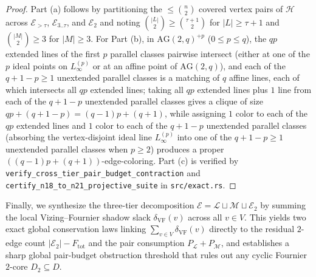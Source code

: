 \documentclass[11pt,reqno]{amsart}
\theoremstyle{definition}
\theoremstyle{remark}
\begin{document}
\begin{proof}
Part (a) follows by partitioning the $\le \binom{n}{2}$ covered vertex pairs of $\mathcal{H}$ across $\mathcal{E}_{>\tau}$, $\mathcal{E}_{3..\tau}$, and $\mathcal{E}_2$ and noting $\binom{|L|}{2} \ge \binom{\tau+1}{2}$ for $|L| \ge \tau + 1$ and $\binom{|M|}{2} \ge 3$ for $|M| \ge 3$. For Part (b), in $\mathrm{AG}(2,q)^{+p}$ ($0 \le p \le q$), the $qp$ extended lines of the first $p$ parallel classes pairwise intersect (either at one of the $p$ ideal points on $L_\infty^{(p)}$ or at an affine point of $\mathrm{AG}(2,q)$), and each of the $q + 1 - p \ge 1$ unextended parallel classes is a matching of $q$ affine lines, each of which intersects all $qp$ extended lines; taking all $qp$ extended lines plus $1$ line from each of the $q + 1 - p$ unextended parallel classes gives a clique of size $qp + (q + 1 - p) = (q - 1)p + (q + 1)$, while assigning $1$ color to each of the $qp$ extended lines and $1$ color to each of the $q + 1 - p$ unextended parallel classes (absorbing the vertex-disjoint ideal line $L_\infty^{(p)}$ into one of the $q + 1 - p \ge 1$ unextended parallel classes when $p \ge 2$) produces a proper $((q - 1)p + (q + 1))$-edge-coloring. Part (c) is verified by \texttt{verify\_cross\_tier\_pair\_budget\_contraction} and \texttt{certify\_n18\_to\_n21\_projective\_suite} in \texttt{src/exact.rs}.
\end{proof}

Finally, we synthesize the three-tier decomposition $\mathcal{E} = \mathcal{L} \sqcup \mathcal{M} \sqcup \mathcal{E}_2$ by summing the local Vizing--Fournier shadow slack $\delta_{\mathrm{VF}}(v)$ across all $v \in V$. This yields two exact global conservation laws linking $\sum_{v \in V} \delta_{\mathrm{VF}}(v)$ directly to the residual $2$-edge count $|\mathcal{E}_2| - F_{\mathrm{tot}}$ and the pair consumption $P_{\mathcal{L}} + P_{\mathcal{M}}$, and establishes a sharp global pair-budget obstruction threshold that rules out any cyclic Fournier $2$-core $D_2 \subseteq D$.
\end{document}
